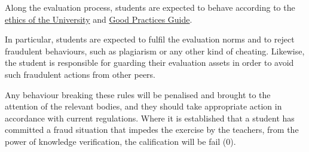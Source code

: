 \documentclass[11pt, a4paper, twoside]{article}
\begin{document}
Along the evaluation process, students are expected to behave according to the
\href{http://www.uc3m.es/portal/page/portal/conocenos/nuestros_estudios/grados/tu_compromiso_universidad}{ethics
of the University} and
\href{http://www.uc3m.es/ss/Satellite/UC3MInstitucional/en/TextoMixta/1371206782958/Guia_de_las_buenas_practicas}{Good
Practices Guide}.

In particular, students are expected to fulfil the evaluation norms and to
reject fraudulent behaviours, such as plagiarism or any other kind of cheating.
Likewise, the student is responsible for guarding their evaluation assets in
order to avoid such fraudulent actions from other peers.

Any behaviour breaking these rules will be penalised and brought to the
attention of the relevant bodies, and they should take appropriate action
in accordance with current regulations. Where it is established that a student
has committed a fraud situation that impedes the exercise by the teachers, from
the power of knowledge verification, the calification will be fail (0).
\end{document}
